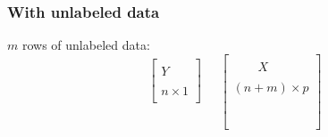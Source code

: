 \documentclass{beamer}
\begin{document}


\begin{frame}
 \frametitle{With unlabeled data}

$m$ rows of unlabeled data:
\begin{displaymath}
\begin{array}{c}
\left[\begin{array}{c}
         \quad \\
          Y \\
          \quad \\
          n \times 1 \\
          \quad 
\end{array}
\right] 
\\
\quad\\
\quad\\
\quad\\
\quad
\end{array}
\quad
\left[\begin{array}{c}
         \quad \\
          \quad\quad X \quad\quad \\
          \quad \\
          (n+m) \times p \\
          \quad \\
          \quad \\
          \quad \\
          \quad \\
          \quad \\
\end{array}
\right] 
\end{displaymath}
\end{frame}

\end{document}
